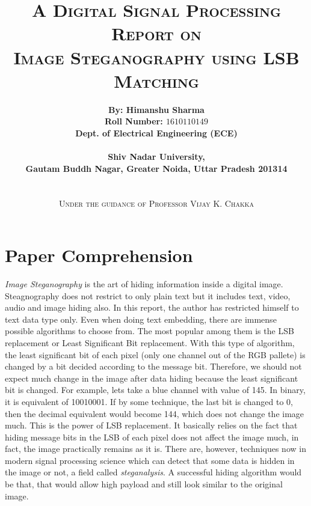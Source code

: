 \documentclass{report}
\title{\textsc{A Digital Signal Processing Report on \\ \Huge Image Steganography using LSB Matching}}
\author{{\bf By: Himanshu Sharma} \\ {\bf Roll Number: $1610110149$} \\ {\bf Dept. of Electrical Engineering (ECE)} \\\\ {\bf Shiv Nadar University,} \\ {\bf Gautam Buddh Nagar,  Greater Noida, Uttar Pradesh 201314} \\\\\\ \textsc{ Under the guidance of Professor Vijay K. Chakka}}
\date{}
\begin{document}
\maketitle
{}
\renewcommand{\thesection}{\arabic{section}}
\section{Paper Comprehension}
{\it Image Steganography} is the art of hiding information inside a digital image. Steagnography does not restrict to only plain text but it includes text, video, audio and image hiding also. In this report, the author has restricted himself to text data type only. Even when doing text embedding, there are immense possible algorithms to choose from. The most popular among them is the LSB replacement or Least Significant Bit replacement. With this type of algorithm, the least significant bit of each pixel (only one channel out of the RGB pallete) is changed by a bit decided according to the message bit. Therefore, we should not expect much change in the image after data hiding because the least significant bit is changed. For example, lets take a blue channel with value of 145. In binary, it is equivalent of 10010001. If by some technique, the last bit is changed to 0, then the decimal equivalent would become 144, which does not change the image much. This is the power of LSB replacement. It basically relies on the fact that hiding message bits in the LSB of each pixel does not affect the image much, in fact, the image practically remains as it is. There are, however, techniques now in modern signal processing science which can detect that some data is hidden in the image or not, a field called {\it steganalysis}. A successful hiding algorithm would be that, that would allow high payload and still look similar to the original image. 
\end{document}
